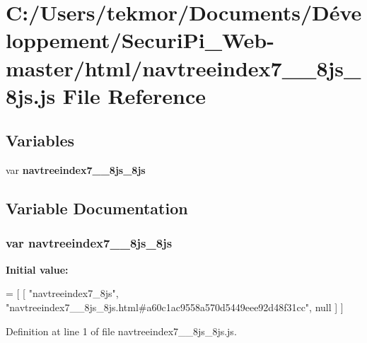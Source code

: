 \section{C\+:/\+Users/tekmor/\+Documents/\+Développement/\+Securi\+Pi\+\_\+\+Web-\/master/html/navtreeindex7\+\_\+\+\_\+8js\+\_\+8js.js File Reference}
\label{navtreeindex7____8js__8js_8js}
\subsection*{Variables}
\begin{DoxyCompactItemize}
\item 
var {\bf navtreeindex7\+\_\+\+\_\+8js\+\_\+8js}
\end{DoxyCompactItemize}


\subsection{Variable Documentation}
\subsubsection[{navtreeindex7\+\_\+\+\_\+8js\+\_\+8js}]{\setlength{\rightskip}{0pt plus 5cm}var navtreeindex7\+\_\+\+\_\+8js\+\_\+8js}\label{navtreeindex7____8js__8js_8js_a1838d7f4559df0146509c9fa855ddc8d}
{\bfseries Initial value\+:}
\begin{DoxyCode}
=
[
    [ \textcolor{stringliteral}{"navtreeindex7\_8js"}, \textcolor{stringliteral}{"navtreeindex7\_\_8js\_8js.html#a60c1ac9558a570d5449eee92d48f31cc"}, null ]
]
\end{DoxyCode}


Definition at line 1 of file navtreeindex7\+\_\+\+\_\+8js\+\_\+8js.\+js.

